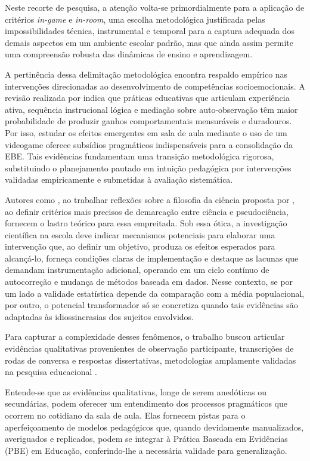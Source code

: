 \documentclass[portuguese]{textolivre}
\begin{document}
Neste recorte de pesquisa, a atenção volta-se primordialmente para a aplicação de critérios \textit{in-game} e \textit{in-room}, uma escolha metodológica justificada pelas impossibilidades técnica, instrumental e temporal para a captura adequada dos demais aspectos em um ambiente escolar padrão, mas que ainda assim permite uma compreensão robusta das dinâmicas de ensino e aprendizagem.

A pertinência dessa delimitação metodológica encontra respaldo empírico nas intervenções direcionadas ao desenvolvimento de competências socioemocionais. A revisão realizada por \textcite{durlak2011impact} indica que práticas educativas que articulam experiência ativa, sequência instrucional lógica e mediação sobre auto-observação têm maior probabilidade de produzir ganhos comportamentais mensuráveis e duradouros. Por isso, estudar os efeitos emergentes em sala de aula mediante o uso de um videogame oferece subsídios pragmáticos indispensáveis para a consolidação da EBE. Tais evidências fundamentam uma transição metodológica rigorosa, substituindo o planejamento pautado em intuição pedagógica por intervenções validadas empiricamente e submetidas à avaliação sistemática.

Autores como \textcite{szczepanik2011concepcao}, ao trabalhar reflexões sobre a filosofia da ciência proposta por \textcite{Bunge1980,hansson2021pseudociencia}, ao definir critérios mais precisos de demarcação entre ciência e pseudociência, fornecem o lastro teórico para essa empreitada. Sob essa ótica, a investigação científica na escola deve indicar mecanismos potenciais para elaborar uma intervenção que, ao definir um objetivo, produza os efeitos esperados para alcançá-lo, forneça condições claras de implementação e destaque as lacunas que demandam instrumentação adicional, operando em um ciclo contínuo de autocorreção e mudança de métodos baseada em dados. Nesse contexto, se por um lado a validade estatística depende da comparação com a média populacional, por outro, o potencial transformador só se concretiza quando tais evidências são adaptadas às idiossincrasias dos sujeitos envolvidos.

Para capturar a complexidade desses fenômenos, o trabalho buscou articular evidências qualitativas provenientes de observação participante, transcrições de rodas de conversa e respostas dissertativas, metodologias amplamente validadas na pesquisa educacional \cite{costa2024likert,kemmis1988action,marques2016observacao,tripp2005pesquisa}.

Entende-se que as evidências qualitativas, longe de serem anedóticas ou secundárias, podem oferecer um entendimento dos processos pragmáticos que ocorrem no cotidiano da sala de aula. Elas fornecem pistas para o aperfeiçoamento de modelos pedagógicos que, quando devidamente manualizados, averiguados e replicados, podem se integrar à Prática Baseada em Evidências (PBE) em Educação, conferindo-lhe a necessária validade para generalização.
\end{document}
